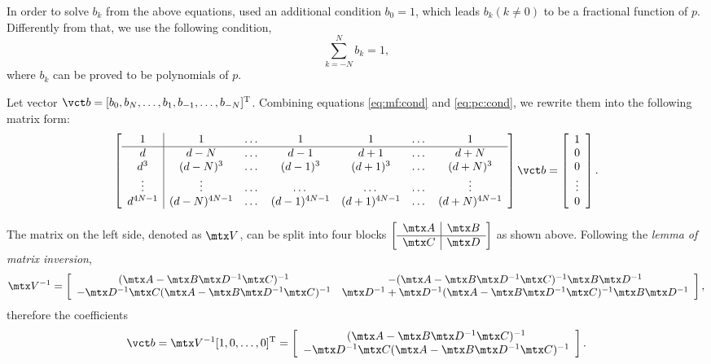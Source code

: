 In order to solve $b_k$ from the above equations,
\cite{thiran1971recursive} used an additional condition $b_0=1$,
which leads $b_k(k\neq 0)$ to be a fractional function of $p$.
Differently from that, we use the following condition,
\begin{equation}\label{eq:pc:cond}
\sum_{k=-N}^N b_k =1,
\end{equation}
where $b_k$ can be proved to be polynomials of $p$.

Let vector $\vct b=[b_0,b_N,\dots,b_1,b_{-1},\dots,b_{-N}]^\textrm T$.
Combining equations \ref{eq:mf:cond} and \ref{eq:pc:cond},
we rewrite them into the following matrix form:
\[
\left[\begin{array}{c|cccccc}
1 & 1 & \dots & 1 & 1 & \dots & 1 \\ \hline
d & d-N &\dots &d-1 & d+1 &\dots & d+N \\
d^3 & (d-N)^3 & \dots & (d-1)^3 & (d+1)^3 &\dots & (d+N)^3 \\
\vdots & \vdots &\dots &\dots &\dots &\dots &\vdots \\
d^{4N-1} & (d-N)^{4N-1} & \dots & (d-1)^{4N-1} 
& (d+1)^{4N-1} &\dots & (d+N)^{4N-1}
\end{array}\right]\vct b=
\left[\begin{array}{c}
1 \\ 0 \\ 0 \\ \vdots \\ 0
\end{array}\right].
\]

The matrix on the left side, denoted as $\mtx V$, 
can be split into four blocks
$\left[\begin{array}{c|c}
\mtx A & \mtx B \\ \hline  \mtx C & \mtx D
\end{array}\right]$ 
as shown above.
Following the \textit{lemma of matrix inversion},
\begin{equation}
\mtx V^{-1}=\left[\begin{array}{cc}
(\mtx A-\mtx B\mtx D^{-1}\mtx C)^{-1} &
-(\mtx A-\mtx B\mtx D^{-1}\mtx C)^{-1}\mtx B\mtx D^{-1} \\
-\mtx D^{-1}\mtx C(\mtx A-\mtx B\mtx D^{-1}\mtx C)^{-1} &
\mtx D^{-1}+\mtx D^{-1}(\mtx A-\mtx B\mtx D^{-1}\mtx C)^{-1}\mtx B\mtx D^{-1} \\
\end{array}\right],
\end{equation}
therefore the coefficients
\begin{equation}\label{eq:sltn}
\vct b=\mtx V^{-1}[1,0,\dots,0]^\textrm T=
\left[\begin{array}{c}
(\mtx A-\mtx B\mtx D^{-1}\mtx C)^{-1} \\
-\mtx D^{-1}\mtx C(\mtx A-\mtx B\mtx D^{-1}\mtx C)^{-1} 
\end{array}\right].
\end{equation}

